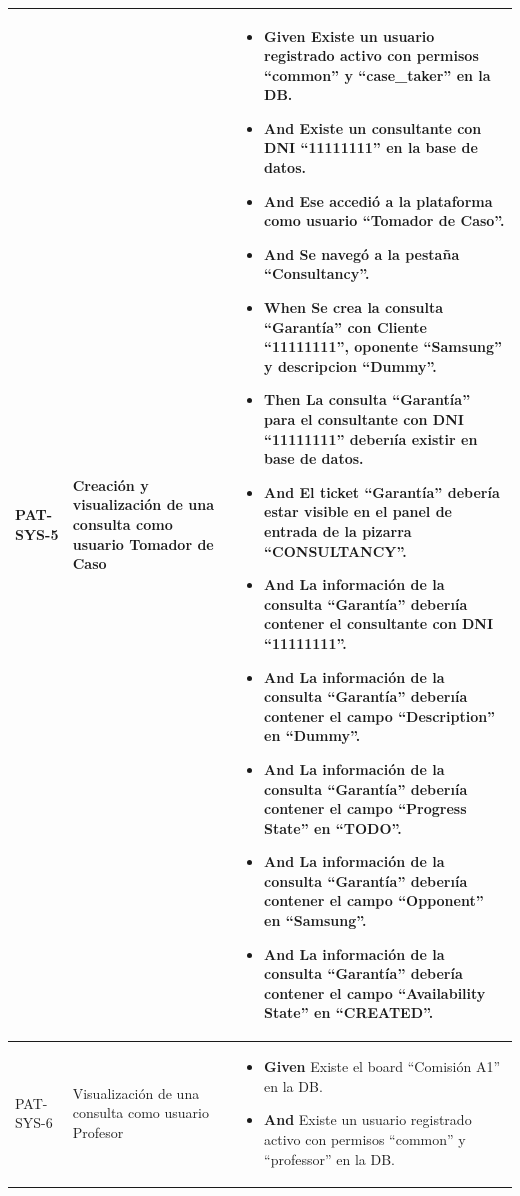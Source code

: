 \begin{longtable}{|p{1cm}|p{2.5cm}|p{12cm}|}
    \hline
    PAT-SYS-5 & Creación y visualización de una consulta como usuario Tomador de Caso & 
    \begin{itemize}
        \item \textbf{Given} Existe un usuario registrado activo con permisos ``common'' y ``case\_taker'' en la DB.
        \item \textbf{And} Existe un consultante con DNI ``11111111'' en la base de datos.
        \item \textbf{And} Ese accedió a la plataforma como usuario ``Tomador de Caso''.
        \item \textbf{And} Se navegó a la pestaña ``Consultancy''.
        \newline
        \item \textbf{When} Se crea la consulta ``Garantía'' con Cliente ``11111111'', oponente ``Samsung'' y descripcion ``Dummy''.
        \newline
        \item \textbf{Then} La consulta ``Garant\'ia'' para el consultante con DNI ``11111111'' deberı\'ia existir en base de datos.
        \item \textbf{And} El ticket ``Garant\'ia'' deber\'ia estar visible en el panel de entrada de la pizarra ``CONSULTANCY''.
        \item \textbf{And} La información de la consulta ``Garant\'ia'' deberı\'ia contener el consultante con DNI ``11111111''.
        \item \textbf{And} La información de la consulta ``Garant\'ia'' deberı\'ia contener el campo ``Description'' en ``Dummy''.
        \item \textbf{And} La información de la consulta ``Garant\'ia'' deberı\'ia contener el campo ``Progress State'' en ``TODO''.
        \item \textbf{And} La información de la consulta ``Garant\'ia'' deberı\'ia contener el campo ``Opponent'' en ``Samsung''.
        \item \textbf{And} La información de la consulta ``Garant\'ia'' deber\'ia contener el campo ``Availability State'' en ``CREATED''.
    \end{itemize}
    \\
    \hline
    PAT-SYS-6 & Visualización de una consulta como usuario Profesor & 
        \begin{itemize}
        \item \textbf{Given} Existe el board ``Comisión A1'' en la DB.
        \item \textbf{And} Existe un usuario registrado activo con permisos ``common'' y ``professor'' en la DB.

\end{itemize}
\end{longtable}
